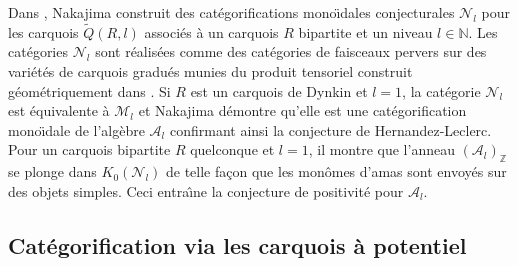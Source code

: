 \documentclass[brochure,12pt]{bourbaki}
\numberwithin{equation}{subsection}
\numberwithin{theorem}{section}
\newcommand{\Z}{\mathbb{Z}}
\newcommand{\N}{\mathbb{N}}
\newcommand{\ca}{{\mathcal A}}
\newcommand{\cm}{{\mathcal M}}
\newcommand{\cn}{{\mathcal N}}
\renewcommand{\tilde}[1]{\widetilde{#1}}
\begin{document}
Dans \cite{Nakajima09}, Nakajima construit
des cat\'egorifications mono\"{\i}dales conjecturales $\cn_l$ pour les carquois
$\tilde{Q}(R,l)$ associ\'es \`a un carquois $R$ bipartite
et un niveau $l\in\N$. Les cat\'egories $\cn_l$ sont r\'ealis\'ees comme des
cat\'egories de faisceaux pervers sur des vari\'et\'es de carquois gradu\'es
\cite{Nakajima01} munies du produit tensoriel construit g\'eom\'etriquement dans \cite{VaragnoloVasserot03}.
Si $R$ est un carquois de Dynkin et $l=1$, la cat\'egorie $\cn_l$ est \'equivalente
\`a $\cm_l$ et Nakajima d\'emontre qu'elle est une cat\'egorification
mono\"{\i}dale de l'alg\`ebre $\ca_l$ confirmant ainsi la conjecture
de Hernandez-Leclerc. Pour un carquois bipartite $R$ quelconque et
$l=1$, il montre que l'anneau $(\ca_l)_\Z$ se plonge dans $K_0(\cn_l)$
de telle fa\c{c}on que les mon\^omes d'amas sont envoy\'es sur
des objets simples. Ceci entra\^{\i}ne la conjecture de positivit\'e pour
$\ca_l$.



\subsection{Cat\'egorification via les carquois \`a potentiel} \label{ss:carquois-a-potentiel}
\end{document}
